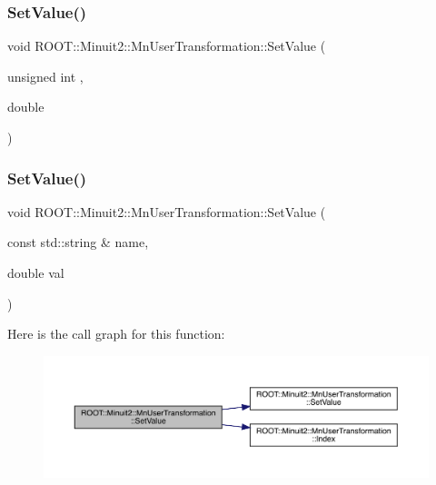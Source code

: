 \subsubsection{\texorpdfstring{SetValue()}{SetValue()}\hspace{0.1cm}{\footnotesize\ttfamily [2/4]}}
{\footnotesize\ttfamily void R\+O\+O\+T\+::\+Minuit2\+::\+Mn\+User\+Transformation\+::\+Set\+Value (\begin{DoxyParamCaption}\item[{unsigned int}]{,  }\item[{double}]{ }\end{DoxyParamCaption})}

\mbox{\label{classROOT_1_1Minuit2_1_1MnUserTransformation_a30717c0bcc5206cc957e505b9cfd64fd}} 
\subsubsection{\texorpdfstring{SetValue()}{SetValue()}\hspace{0.1cm}{\footnotesize\ttfamily [3/4]}}
{\footnotesize\ttfamily void R\+O\+O\+T\+::\+Minuit2\+::\+Mn\+User\+Transformation\+::\+Set\+Value (\begin{DoxyParamCaption}\item[{const std\+::string \&}]{name,  }\item[{double}]{val }\end{DoxyParamCaption})}

Here is the call graph for this function\+:\nopagebreak
\begin{figure}[H]
\begin{center}
\leavevmode
\includegraphics[width=350pt]{d9/d98/classROOT_1_1Minuit2_1_1MnUserTransformation_a30717c0bcc5206cc957e505b9cfd64fd_cgraph}
\end{center}
\end{figure}
\mbox{\label{classROOT_1_1Minuit2_1_1MnUserTransformation_a30717c0bcc5206cc957e505b9cfd64fd}} 
